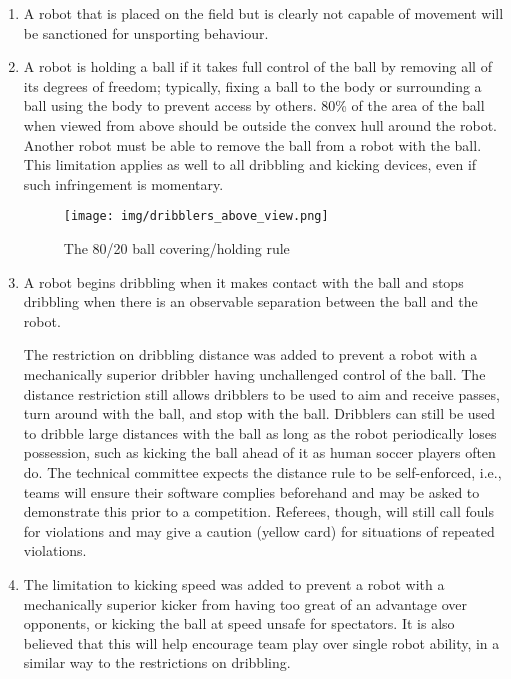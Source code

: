 \begin{enumerate}
\item
A robot that is placed on the field but is clearly not capable of movement will be sanctioned for unsporting behaviour.

\item
A robot is holding a ball if it takes full control of the ball by removing all of its degrees of freedom; typically, fixing a ball to the body or surrounding a ball using the body to prevent access by others.
80\% of the area of the ball when viewed from above should be outside the convex hull around the robot.
Another robot must be able to remove the ball from a robot with the ball.
This limitation applies as well to all dribbling and kicking devices, even if such infringement is momentary.

\begin{figure}[ht] %
	\centering
	\texttt{[image: img/dribblers\_above\_view.png]}
	\caption{The 80/20 ball covering/holding rule}
	\label{fig:20-rule}
\end{figure}

\item
A robot begins dribbling when it makes contact with the ball and stops dribbling when there is an observable separation between the ball and the robot.

The restriction on dribbling distance was added to prevent a robot with a mechanically superior dribbler having unchallenged control of the ball.
The distance restriction still allows dribblers to be used to aim and receive passes, turn around with the ball, and stop with the ball.
Dribblers can still be used to dribble large distances with the ball as long as the robot periodically loses possession, such as kicking the ball ahead of it as human soccer players often do.
The technical committee expects the distance rule to be self-enforced, i.e., teams will ensure their software complies beforehand and may be asked to demonstrate this prior to a competition.
Referees, though, will still call fouls for violations and may give a caution (yellow card) for situations of repeated violations.

\item
The limitation to kicking speed was added to prevent a robot with a mechanically superior kicker from having too great of an advantage over opponents, or kicking the ball at speed unsafe for spectators.
It is also believed that this will help encourage team play over single robot ability, in a similar way to the restrictions on dribbling.


\end{enumerate}
